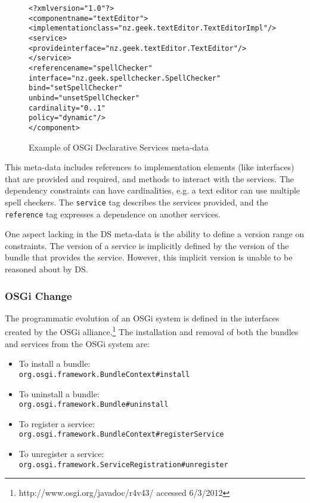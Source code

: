 \begin{figure}[htp]
\begin{center}
\begin{alltt}
<?xml version="1.0"?>
<component name="textEditor">
    <implementation class="nz.geek.textEditor.TextEditorImpl"/>
    <service>
        <provide interface="nz.geek.textEditor.TextEditor"/>
    </service>
    <reference name="spellChecker"
        interface="nz.geek.spellchecker.SpellChecker"
        bind="setSpellChecker"
        unbind="unsetSpellChecker"
        cardinality="0..1"
        policy="dynamic"/>
</component>
\end{alltt}
  \caption{Example of OSGi Declarative Services meta-data}
  \label{dsmetadata}
\end{center}
\end{figure}

This meta-data includes references to implementation elements (like interfaces) that are provided and required, and methods to interact with the services.
The dependency constraints can have cardinalities, e.g. a text editor can use multiple spell checkers.
The \texttt{service} tag describes the services provided, and the \texttt{reference} tag expresses a dependence on another services.

One aspect lacking in the DS meta-data is the ability to define a version range on constraints.
The version of a service is implicitly defined by the version of the bundle that provides the service.
However, this implicit version is unable to be reasoned about by DS.

\subsubsection{OSGi Change}
The programmatic evolution of an OSGi system is defined in the interfaces created by the OSGi alliance.\footnote{http://www.osgi.org/javadoc/r4v43/ accessed 6/3/2012}
The installation and removal of both the bundles and services from the OSGi system are:
 
\begin{itemize}
  \item To install a bundle:\\ \texttt{org.osgi.framework.BundleContext}\verb+#+\texttt{install}
  \item To uninstall a bundle:\\ \texttt{org.osgi.framework.Bundle}\verb+#+\texttt{uninstall}
  \item To register a service: \\ \texttt{org.osgi.framework.BundleContext}\verb+#+\texttt{registerService}
  \item To unregister a service: \\ \texttt{org.osgi.framework.ServiceRegistration}\verb+#+\texttt{unregister}
\end{itemize}

